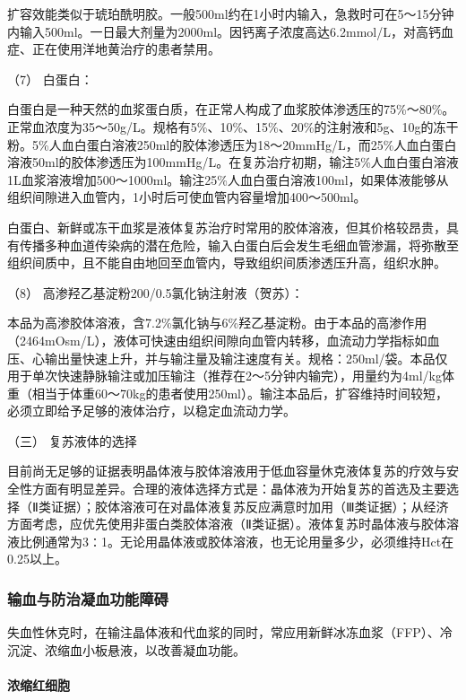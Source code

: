 扩容效能类似于琥珀酰明胶。一般500ml约在1小时内输入，急救时可在5～15分钟内输入500ml。一日最大剂量为2000ml。因钙离子浓度高达6.2mmol/L，对高钙血症、正在使用洋地黄治疗的患者禁用。

\hypertarget{text00061.htmlux5cux23CHP2-4-3-2-2-2-7}{}
（7） 白蛋白：

白蛋白是一种天然的血浆蛋白质，在正常人构成了血浆胶体渗透压的75\%～80\%。正常血浓度为35～50g/L。规格有5\%、10\%、15\%、20\%的注射液和5g、10g的冻干粉。5\%人血白蛋白溶液250ml的胶体渗透压为18～20mmHg/L，而25\%人血白蛋白溶液50ml的胶体渗透压为100mmHg/L。在复苏治疗初期，输注5\%人血白蛋白溶液1L血浆溶液增加500～1000ml。输注25\%人血白蛋白溶液100ml，如果体液能够从组织间隙进入血管内，1小时后可使血管内容量增加400～500ml。

白蛋白、新鲜或冻干血浆是液体复苏治疗时常用的胶体溶液，但其价格较昂贵，具有传播多种血道传染病的潜在危险，输入白蛋白后会发生毛细血管渗漏，将弥散至组织间质中，且不能自由地回至血管内，导致组织间质渗透压升高，组织水肿。

\hypertarget{text00061.htmlux5cux23CHP2-4-3-2-2-2-8}{}
（8） 高渗羟乙基淀粉200/0.5氯化钠注射液（贺苏）：

本品为高渗胶体溶液，含7.2\%氯化钠与6\%羟乙基淀粉。由于本品的高渗作用（2464mOsm/L），液体可快速由组织间隙向血管内转移，血流动力学指标如血压、心输出量快速上升，并与输注量及输注速度有关。规格：250ml/袋。本品仅用于单次快速静脉输注或加压输注（推荐在2～5分钟内输完），用量约为4ml/kg体重（相当于体重60～70kg的患者使用250ml）。输注本品后，扩容维持时间较短，必须立即给予足够的液体治疗，以稳定血流动力学。

\hypertarget{text00061.htmlux5cux23CHP2-4-3-2-3}{}
（三） 复苏液体的选择

目前尚无足够的证据表明晶体液与胶体溶液用于低血容量休克液体复苏的疗效与安全性方面有明显差异。合理的液体选择方式是：晶体液为开始复苏的首选及主要选择（Ⅱ类证据）；胶体溶液可在对晶体液复苏反应满意时加用（Ⅲ类证据）；从经济方面考虑，应优先使用非蛋白类胶体溶液（Ⅱ类证据）。液体复苏时晶体液与胶体溶液比例通常为3∶1。无论用晶体液或胶体溶液，也无论用量多少，必须维持Hct在0.25以上。

\subsubsection{输血与防治凝血功能障碍}

失血性休克时，在输注晶体液和代血浆的同时，常应用新鲜冰冻血浆（FFP）、冷沉淀、浓缩血小板悬液，以改善凝血功能。

\paragraph{浓缩红细胞}


